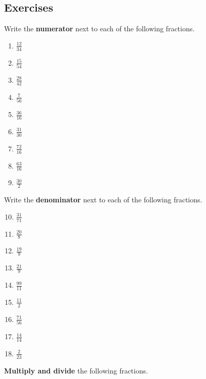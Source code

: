 \documentclass[12pt]{article}
\theoremstyle{definition}
\begin{document}
\subsection{Exercises}
Write the \textbf{numerator} next to each of the following fractions.
\begin{multicols}{3}
	\begin{enumerate}[1)]
		\item \large{$\frac{12}{34}$}
		\item \large{$\frac{15}{54}$}
		\item \large{$\frac{28}{42}$}
		\item \large{$\frac{7}{56}$}
		\item \large{$\frac{36}{16}$}
		\item \large{$\frac{31}{30}$}
		\item \large{$\frac{72}{16}$}
		\item \large{$\frac{63}{16}$}
		\item \large{$\frac{30}{2}$}
	\end{enumerate}
\end{multicols}
Write the \textbf{denominator} next to each of the following fractions.
\begin{multicols}{3}
	\begin{enumerate}[1)]\setcounter{enumi}{9}
		\item \large{$\frac{31}{71}$}
		\item \large{$\frac{20}{8}$} 
		\item \large{$\frac{19}{9}$}
		\item \large{$\frac{21}{9}$}
		\item \large{$\frac{99}{11}$}
		\item \large{$\frac{11}{2}$}
		\item \large{$\frac{71}{56}$}
		\item \large{$\frac{14}{14}$}
		\item \large{$\frac{2}{23}$}
	\end{enumerate}
\end{multicols}
\textbf{Multiply and divide} the following fractions.
\end{document}
